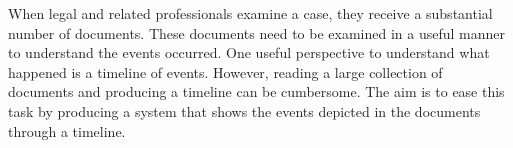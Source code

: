 When legal and related professionals examine a case, they receive a substantial number of documents. These documents need to be examined in a useful manner to understand the events occurred. One useful perspective to understand what happened is a timeline of events. However, reading a large collection of documents and producing a timeline can be cumbersome. The aim is to ease this task by producing a system that shows the events depicted in the documents through a timeline.